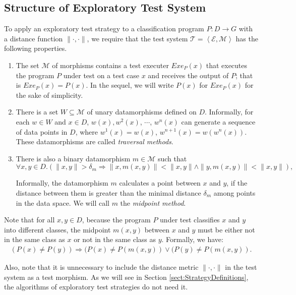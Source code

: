 \documentclass[preprint,1p,authoryear,times]{elsarticle}
\begin{document}
\subsection{Structure of Exploratory Test System}

To apply an exploratory test strategy to a classification program $P: D \rightarrow G$ with a distance function $\|\cdot,\cdot\|$, we require that the test system $\mathscr{T} = \left< \mathscr{E}, \mathscr{M}\right>$ has the following properties. 
\begin{enumerate}
\item The set $\mathscr{M}$ of morphisms contains a test executer $Exe_P(x)$ that executes the program $P$ under test on a test case $x$ and receives the output of $P$; that is $Exe_P(x)= P(x)$. In the sequel, we will write $P(x)$ for $Exe_P(x)$ for the sake of simplicity. 
\item There is a set $W \subseteq \mathscr{M}$ of unary datamorphisms defined on $D$. Informally, for each $w \in W$ and $x \in D$, $w(x),w^2 (x)$, $\cdots$, $w^n(x)$ can generate a sequence of data points in $D$, where $w^1(x)=w(x)$, $w^{n+1}(x)=w(w^n(x))$. These datamorphisms are called \emph{traversal methods}. 
\item There is also a binary datamorphism $m \in \mathscr{M}$ such that 
\begin{equation}
\forall x,y \in D. \left(\|x,y\| > \delta_m \Rightarrow \|x,m(x,y)\| < \|x,y\| \wedge \|y,m(x,y)\| < \|x,y\|\right), \label{eqn:E2_0}
\end{equation}

Informally, the datamorphism $m$ calculates a point between $x$ and $y$, if the distance between them is greater than the minimal distance $\delta_m$ among points in the data space. We will call $m$ the \emph{midpoint method}.
\end{enumerate}

Note that for all $x,y \in D$, because the program $P$ under test classifies $x$ and $y$ into different classes, the midpoint $m(x,y)$ between $x$ and $y$ must be either not in the same class as $x$ or not in the same class as $y$. Formally, we have: 
\begin{eqnarray}
(P(x) \neq P(y)) \Rightarrow (P(x) \neq P(m(x,y)) \vee (P(y) \neq P(m(x,y)). \label{eqn:Eqn0}
\end{eqnarray}

Also, note that it is unnecessary to include the distance metric $\|\cdot,\cdot\|$ in the test system as a test morphism. As we will see in Section \ref{sect:StrategyDefinitions}, the algorithms of exploratory test strategies do not need it.
\end{document}
